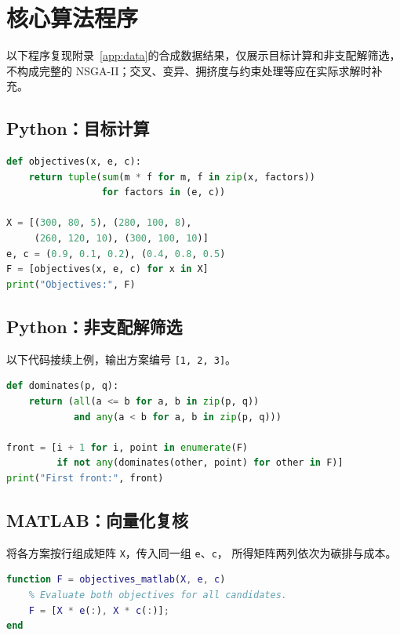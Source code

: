 \clearpage
\section{核心算法程序}
\label{app:code}
以下程序复现附录~\ref{app:data}的合成数据结果，仅展示目标计算和非支配解筛选，
不构成完整的 NSGA-II；交叉、变异、拥挤度与约束处理等应在实际求解时补充。

\subsection{Python：目标计算}
\begin{lstlisting}[language=Python]
def objectives(x, e, c):
    return tuple(sum(m * f for m, f in zip(x, factors))
                 for factors in (e, c))

X = [(300, 80, 5), (280, 100, 8),
     (260, 120, 10), (300, 100, 10)]
e, c = (0.9, 0.1, 0.2), (0.4, 0.8, 0.5)
F = [objectives(x, e, c) for x in X]
print("Objectives:", F)
\end{lstlisting}

\subsection{Python：非支配解筛选}
以下代码接续上例，输出方案编号 \texttt{[1, 2, 3]}。
\begin{lstlisting}[language=Python]
def dominates(p, q):
    return (all(a <= b for a, b in zip(p, q))
            and any(a < b for a, b in zip(p, q)))

front = [i + 1 for i, point in enumerate(F)
         if not any(dominates(other, point) for other in F)]
print("First front:", front)
\end{lstlisting}

\subsection{MATLAB：向量化复核}
将各方案按行组成矩阵 \texttt{X}，传入同一组 \texttt{e}、\texttt{c}，
所得矩阵两列依次为碳排与成本。
\begin{lstlisting}[language=Matlab]
function F = objectives_matlab(X, e, c)
    % Evaluate both objectives for all candidates.
    F = [X * e(:), X * c(:)];
end
\end{lstlisting}
